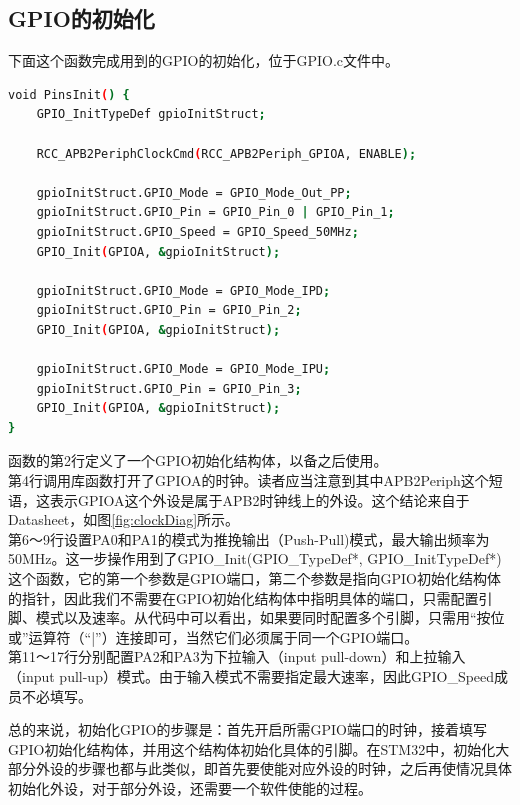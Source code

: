 	\subsection{GPIO的初始化}
		下面这个函数完成用到的GPIO的初始化，位于GPIO.c文件中。
		\par 
		\begin{lstlisting}[language=bash, style=customStyleC, caption=GPIO初始化]
void PinsInit() {
	GPIO_InitTypeDef gpioInitStruct;
	
	RCC_APB2PeriphClockCmd(RCC_APB2Periph_GPIOA, ENABLE);
	
	gpioInitStruct.GPIO_Mode = GPIO_Mode_Out_PP;
	gpioInitStruct.GPIO_Pin = GPIO_Pin_0 | GPIO_Pin_1;
	gpioInitStruct.GPIO_Speed = GPIO_Speed_50MHz;
	GPIO_Init(GPIOA, &gpioInitStruct);
	
	gpioInitStruct.GPIO_Mode = GPIO_Mode_IPD;
	gpioInitStruct.GPIO_Pin = GPIO_Pin_2;
	GPIO_Init(GPIOA, &gpioInitStruct);
	
	gpioInitStruct.GPIO_Mode = GPIO_Mode_IPU;
	gpioInitStruct.GPIO_Pin = GPIO_Pin_3;
	GPIO_Init(GPIOA, &gpioInitStruct);
}
		\end{lstlisting}
		\par 
		函数的第2行定义了一个GPIO初始化结构体，以备之后使用。\\
		第4行调用库函数打开了GPIOA的时钟。读者应当注意到其中APB2Periph这个短语，这表示GPIOA这个外设是属于APB2时钟线上的外设。这个结论来自于Datasheet，如图\ref{fig:clockDiag}所示。
		\\
		第6～9行设置PA0和PA1的模式为推挽输出（Push-Pull)模式，最大输出频率为50MHz。这一步操作用到了GPIO\_Init(GPIO\_TypeDef*, GPIO\_InitTypeDef*)这个函数，它的第一个参数是GPIO端口，第二个参数是指向GPIO初始化结构体的指针，因此我们不需要在GPIO初始化结构体中指明具体的端口，只需配置引脚、模式以及速率。从代码中可以看出，如果要同时配置多个引脚，只需用“按位或”运算符（“|”）连接即可，当然它们必须属于同一个GPIO端口。
		\\
		第11～17行分别配置PA2和PA3为下拉输入（input pull-down）和上拉输入（input pull-up）模式。由于输入模式不需要指定最大速率，因此GPIO\_Speed成员不必填写。
		\par 
		总的来说，初始化GPIO的步骤是：首先开启所需GPIO端口的时钟，接着填写GPIO初始化结构体，并用这个结构体初始化具体的引脚。在STM32中，初始化大部分外设的步骤也都与此类似，即首先要使能对应外设的时钟，之后再使情况具体初始化外设，对于部分外设，还需要一个软件使能的过程。
		
